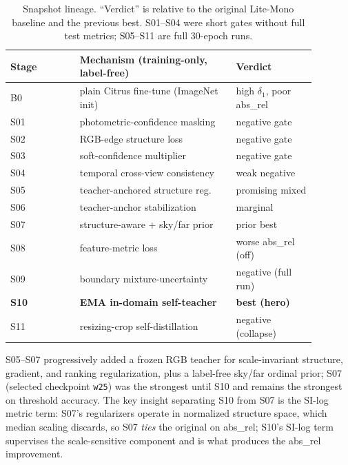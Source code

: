 \documentclass[conference]{IEEEtran}
\begin{document}
\begin{table}[t]
\centering
\caption{Snapshot lineage. ``Verdict'' is relative to the original Lite-Mono
baseline and the previous best. S01--S04 were short gates without full test
metrics; S05--S11 are full 30-epoch runs.}
\label{tab:journey}
\footnotesize
\begin{tabular}{@{}p{0.20\linewidth}p{0.45\linewidth}p{0.23\linewidth}@{}}
\toprule
Stage & Mechanism (training-only, label-free) & Verdict \\
\midrule
B0 & plain Citrus fine-tune (ImageNet init) & high $\delta_1$, poor abs\_rel \\
S01 & photometric-confidence masking & negative gate \\
S02 & RGB-edge structure loss & negative gate \\
S03 & soft-confidence multiplier & negative gate \\
S04 & temporal cross-view consistency & weak negative \\
S05 & teacher-anchored structure reg.\ & promising mixed \\
S06 & teacher-anchor stabilization & marginal \\
S07 & structure-aware + sky/far prior & prior best \\
S08 & feature-metric loss & worse abs\_rel (off) \\
S09 & boundary mixture-uncertainty & negative (full run) \\
\textbf{S10} & \textbf{EMA in-domain self-teacher} & \textbf{best (hero)} \\
S11 & resizing-crop self-distillation & negative (collapse) \\
\bottomrule
\end{tabular}
\end{table}

S05--S07 progressively added a frozen RGB teacher for scale-invariant structure,
gradient, and ranking regularization, plus a label-free sky/far ordinal prior;
S07 (selected checkpoint \texttt{w25}) was the strongest until S10 and remains
the strongest on threshold accuracy. The key insight separating S10 from S07 is
the SI-log metric term: S07's regularizers operate in normalized structure space,
which median scaling discards, so S07 \emph{ties} the original on abs\_rel; S10's
SI-log term supervises the scale-sensitive component and is what produces the
abs\_rel improvement.

\end{document}
